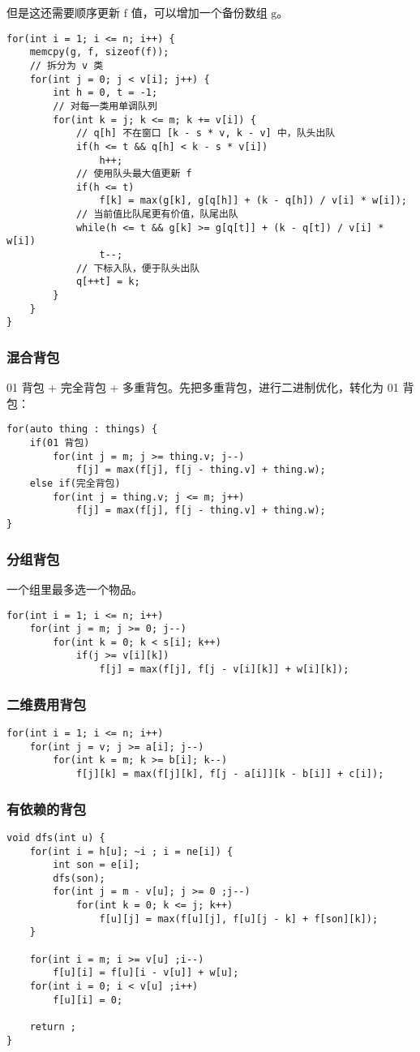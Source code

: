 \documentclass[UTF8]{article}
\begin{document}
但是这还需要顺序更新 $\mathrm{f}$ 值，可以增加一个备份数组 $\mathrm{g}$。
\begin{lstlisting}[caption=多重背包单调队列优化]
for(int i = 1; i <= n; i++) {
	memcpy(g, f, sizeof(f));
	// 拆分为 v 类
	for(int j = 0; j < v[i]; j++) {
		int h = 0, t = -1;
		// 对每一类用单调队列
		for(int k = j; k <= m; k += v[i]) {
			// q[h] 不在窗口 [k - s * v, k - v] 中，队头出队
			if(h <= t && q[h] < k - s * v[i])
				h++;
			// 使用队头最大值更新 f
			if(h <= t)
				f[k] = max(g[k], g[q[h]] + (k - q[h]) / v[i] * w[i]);
			// 当前值比队尾更有价值，队尾出队
			while(h <= t && g[k] >= g[q[t]] + (k - q[t]) / v[i] * w[i])
				t--;
			// 下标入队，便于队头出队
			q[++t] = k;
		}
	}
}
\end{lstlisting}


\subsubsection{混合背包}
01 背包 + 完全背包 + 多重背包。先把多重背包，进行二进制优化，转化为 01 背包：
\begin{lstlisting}[caption=混合背包]
for(auto thing : things) {
	if(01 背包)
		for(int j = m; j >= thing.v; j--)
			f[j] = max(f[j], f[j - thing.v] + thing.w);
	else if(完全背包)
		for(int j = thing.v; j <= m; j++)
			f[j] = max(f[j], f[j - thing.v] + thing.w);
}
\end{lstlisting}


\subsubsection{分组背包}
一个组里最多选一个物品。
\begin{lstlisting}[caption=分组背包]
for(int i = 1; i <= n; i++)
	for(int j = m; j >= 0; j--)
		for(int k = 0; k < s[i]; k++)
			if(j >= v[i][k])
				f[j] = max(f[j], f[j - v[i][k]] + w[i][k]);
\end{lstlisting}


\subsubsection{二维费用背包}
\begin{lstlisting}[caption=二维费用背包]
for(int i = 1; i <= n; i++) 
	for(int j = v; j >= a[i]; j--)
		for(int k = m; k >= b[i]; k--)
			f[j][k] = max(f[j][k], f[j - a[i]][k - b[i]] + c[i]);
\end{lstlisting}


\subsubsection{有依赖的背包}
\begin{lstlisting}[caption=有依赖的背包]
void dfs(int u) {
	for(int i = h[u]; ~i ; i = ne[i]) {
		int son = e[i];
		dfs(son);
		for(int j = m - v[u]; j >= 0 ;j--)
			for(int k = 0; k <= j; k++)
				f[u][j] = max(f[u][j], f[u][j - k] + f[son][k]);
	}
    
	for(int i = m; i >= v[u] ;i--)
		f[u][i] = f[u][i - v[u]] + w[u];
	for(int i = 0; i < v[u] ;i++)
		f[u][i] = 0;
    
	return ;
}
\end{lstlisting}
\end{document}
